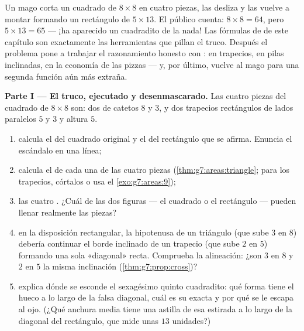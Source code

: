 \begin{problem}[{Problema de fin de semana --- una «demostración» famosa de que
$64 = 65$, desenmascarada con áreas y pendientes, con pizzas y coronas de
postre}]
\label{pb:g7:areas:1}
Un mago corta un cuadrado de $8 \times 8$ en cuatro piezas, las desliza
y las vuelve a montar formando un rectángulo de $5 \times 13$.
El público cuenta: $8 \times 8 = 64$, pero
$5 \times 13 = 65$ --- ¡ha aparecido un cuadradito de la nada!
Las fórmulas de  de este capítulo son exactamente las herramientas que
pillan el truco. Después el problema pone a trabajar el razonamiento honesto con :
en trapecios, en pilas inclinadas, en la economía de las pizzas --- y,
por último, vuelve al mago para una segunda función aún más
extraña.

\medskip
\noindent\textbf{Parte I --- El truco, ejecutado y desenmascarado.}
Las cuatro piezas del cuadrado de $8 \times 8$ son: dos  de catetos $8$ y $3$, y dos trapecios rectángulos de
lados paralelos $5$ y $3$ y altura $5$.
\begin{enumerate}
  \item calcula el  del cuadrado original y el  del
        rectángulo que se afirma. Enuncia el escándalo en una línea;
  \item calcula el  de cada una de las cuatro piezas
        (\cref{thm:g7:areas:triangle}; para los trapecios, córtalos
        o usa el \cref{exo:g7:areas:9});
  \item {} las cuatro . ¿Cuál de las dos figuras --- el cuadrado
        o el rectángulo --- pueden llenar realmente las piezas?
  \item en la disposición rectangular, la hipotenusa de un triángulo
        (que sube $3$ en $8$) debería continuar el borde inclinado de
        un trapecio (que sube $2$ en $5$) formando una sola
        «diagonal» recta. Comprueba la alineación: ¿son $3$ en
        $8$ y $2$ en $5$ la misma inclinación
        (\cref{thm:g7:prop:cross})?
  \item explica dónde se esconde el sexagésimo quinto cuadradito: qué forma tiene
        el hueco a lo largo de la falsa diagonal, cuál es su  exacta
        y por qué se le escapa al ojo. (¿Qué anchura media tiene una
        astilla de esa  estirada a lo largo de la diagonal del rectángulo,
        que mide unas $13$ unidades?)
\end{enumerate}


\end{problem}
